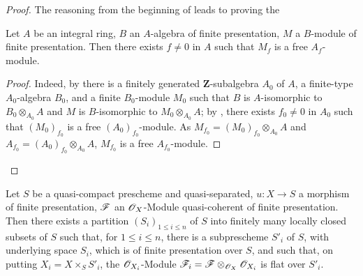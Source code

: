 \begin{proof}
The reasoning from the beginning of  leads to proving the

\begin{lemma}[8.9.4.1]
\label{IV.8.9.4.1}
Let $A$ be an integral ring, $B$ an $A$-algebra of finite presentation, $M$ a $B$-module of finite presentation.
Then there exists $f\neq 0$ in $A$ such that $M_f$ is a free $A_f$-module.
\end{lemma}

\begin{proof}
Indeed, by  there is a finitely generated $\mathbf{Z}$-subalgebra $A_0$ of $A$, a finite-type $A_0$-algebra $B_0$, and a finite $B_0$-module $M_0$ such that $B$ is $A$-isomorphic to $B_0\otimes_{A_0}A$ and $M$ is $B$-isomorphic to $M_0\otimes_{A_0}A$; by , there exists $f_0\neq 0$ in $A_0$ such that $(M_0)_{f_0}$ is a free $(A_0)_{f_0}$-module.
As $M_{f_0}=(M_0)_{f_0}\otimes_{A_0}A$ and $A_{f_0}=(A_0)_{f_0}\otimes_{A_0}A$, $M_{f_0}$ is a free $A_{f_0}$-module.
\end{proof}
\end{proof}

\begin{corollary}[8.9.5]
\label{IV.8.9.5}
Let $S$ be a quasi-compact prescheme and quasi-separated, $u:X\to S$ a morphism of finite presentation, $\mathscr{F}$ an $\mathscr{O}_X$-Module quasi-coherent of finite presentation.
Then there exists a partition $(S_i)_{1\leqslant i\leqslant n}$ of $S$ into finitely many locally closed subsets of $S$ such that, for $1\leqslant i\leqslant n$, there is a subprescheme $S'_i$ of $S$, with underlying space $S_i$, which is of finite presentation over $S$, and such that, on putting $X_i=X\times_S S'_i$, the $\mathscr{O}_{X_i}$-Module $\mathscr{F}_i=\mathscr{F}\otimes_{\mathscr{O}_X}\mathscr{O}_{X_i}$ is flat over $S'_i$.
\end{corollary}

